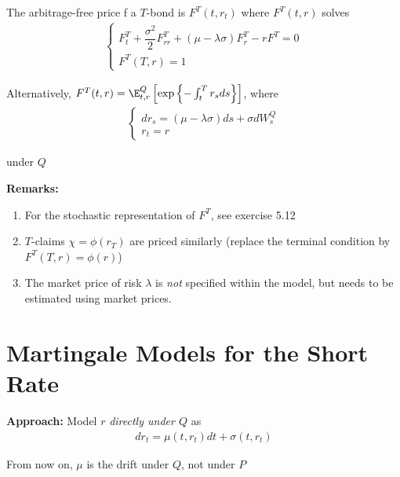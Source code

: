 \begin{lem}{}
  The arbitrage-free price f a $T$-bond is $F^T(t,r_t)$ where $F^T(t,r)$ solves
  \begin{equation*}
    \begin{gathered}
      \begin{cases}
        F_t^T+\dfrac{\sigma^2}{2}F_{rr}^T+(\mu-\lambda\sigma)F_r^T-rF^T=0\\
        F^T(T,r) =1
      \end{cases}
    \end{gathered}
  \end{equation*}\par
  \noindent Alternatively, $F^T(t,r) = \E_{t,r}^Q\left[\text{exp}\left\{-\int_{t}^{T}r_sds\right\}\right]$, where
  \begin{equation*}
    \begin{gathered}
      \begin{cases}
        dr_s = (\mu-\lambda\sigma)ds+\sigma dW_s^Q\\
        r_t=r
      \end{cases}
    \end{gathered}
  \end{equation*}\par
  \noindent under $Q$
\end{lem}
\par\bigskip
\noindent\textbf{Remarks:}\par
\begin{enumerate}[leftmargin=*]
  \item For the stochastic representation of $F^T$, see exercise 5.12
  \item $T$-claims $\chi =\phi(r_T)$ are priced similarly (replace the terminal condition by $F^T(T,r) = \phi(r)$)
  \item The market price of risk $\lambda$ is \textit{not} specified within the model, but needs to be estimated using market prices.
\end{enumerate}
\par\bigskip
\section{Martingale Models for the Short Rate}
\noindent\textbf{Approach:} Model $r$ \textit{directly under $Q$}  as 
\begin{equation*}
  \begin{gathered}
    dr_t = \mu(t,r_t)dt+\sigma(t,r_t)
  \end{gathered}
\end{equation*}\par
\noindent From now on, $\mu$ is the drift under $Q$, not under $P$
\par\bigskip
